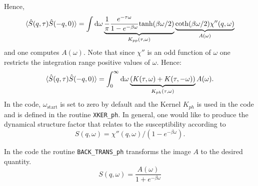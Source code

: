 Hence,
\begin{equation}
	\langle \hat{S}(q,\tau) \hat{S}(-q,0) \rangle  =  
       \int {\text d} \omega  \underbrace{ \frac{1}{\pi} \frac{e^{- \tau \omega} }
            { 1 - e^{-\beta  \omega} } \text{tanh}(\beta \omega/2)  }_{K_{pp}(\tau,\omega)} 
       \underbrace{ \text{coth}(\beta \omega/2)   \chi''(q,\omega) }_{A(\omega)} 
\label{Kpp.eq}
\end{equation}
and one  computes $A(\omega)$. Note that since $\chi'' $ is an odd function of $\omega$  one restricts the integration range  positive values of $\omega$. 
Hence: 
\begin{equation}
	\langle \hat{S}(q,\tau) \hat{S}(-q,0) \rangle  =  
       \int_{0}^{\infty}  {\text d} \omega \underbrace{\left( K(\tau,\omega)  + K(\tau,-\omega) \right)}_{K_{ph}(\tau,\omega)}  A(\omega).
\end{equation}
In the code, $\omega_\text{start}$ is set to zero by default and the Kernel $K_{ph}$ is used in the code and is defined in the  routine \texttt{XKER\_ph}. 
In general,  one would like to produce the  dynamical structure factor that relates to the susceptibility according to
\begin{equation}
 S(q,\omega)  = \chi''(q,\omega)/\left( 1 - e^{-\beta  \omega} \right). 
\end{equation}

In the code the routine \texttt{BACK\_TRANS\_ph}   transforms the image $A$ to the desired quantity.
\begin{equation}
	S(q,\omega) = \frac{A(\omega)}{1 + e^{-\beta \omega} }  
\end{equation}

